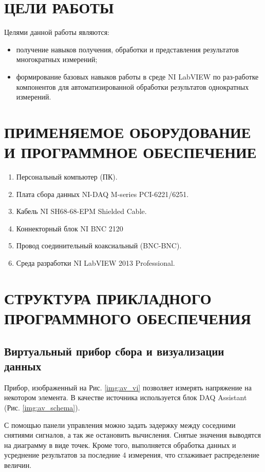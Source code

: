 \documentclass[a4paper,14pt]{article}
\begin{document}

\tableofcontents
\pagebreak

\section{ЦЕЛИ РАБОТЫ}
Целями данной работы являются:

\begin{itemize}
	\item получение навыков получения, обработки и представления результатов многократных измерений;
	\item формирование базовых навыков работы в среде NI LabVIEW по раз-работке компонентов для автоматизированной обработки результатов однократных измерений.
\end{itemize}

\section{ПРИМЕНЯЕМОЕ ОБОРУДОВАНИЕ И ПРОГРАММНОЕ ОБЕСПЕЧЕНИЕ}

\begin{enumerate}
	\item	Персональный компьютер (ПК).
	\item	Плата сбора данных NI-DAQ M-series PCI-6221/6251.
	\item	Кабель NI SH68-68-EPM Shielded Cable.
	\item	Коннекторный блок NI BNC 2120 
	\item	Провод соединительный коаксиальный (BNC-BNC).
	\item	Среда разработки NI LabVIEW 2013 Professional.
\end{enumerate}


\section{СТРУКТУРА ПРИКЛАДНОГО 	ПРОГРАММНОГО ОБЕСПЕЧЕНИЯ}
\subsection{Виртуальный прибор сбора и визуализации данных}

Прибор, изображенный на Рис. \ref{img:av_vi} позволяет измерять напряжение на некотором элемента.
В качестве источника используется блок DAQ Assistant (Рис. \ref{img:av_schema}).

С помощью панели управления можно задать задержку между соседними снятиями сигналов, а так же остановить вычисления.
Снятые значения выводятся на диаграмму в виде точек.
Кроме того, выполняется обработка данных и усреднение результатов за последние 4 измерения, что сглаживает распределение величин.
\end{document}
